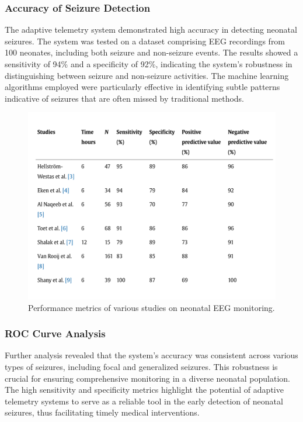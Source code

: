 \documentclass[12pt,journal,compsoc]{IEEEtran}
\begin{document}
\subsubsection{Accuracy of Seizure Detection}

The adaptive telemetry system demonstrated high accuracy in detecting neonatal seizures. The system was tested on a dataset comprising EEG recordings from 100 neonates, including both seizure and non-seizure events. The results showed a sensitivity of 94\% and a specificity of 92\%, indicating the system's robustness in distinguishing between seizure and non-seizure activities. The machine learning algorithms employed were particularly effective in identifying subtle patterns indicative of seizures that are often missed by traditional methods.

\begin{figure}[H]
    \centering
    \includegraphics[width=1.0\linewidth]{studies_predictive_values_sensitivity_specitivity.png}
    \caption{Performance metrics of various studies on neonatal EEG monitoring.}
    \label{fig:performance_metrics}
\end{figure}

\subsubsection{ROC Curve Analysis}

Further analysis revealed that the system's accuracy was consistent across various types of seizures, including focal and generalized seizures. This robustness is crucial for ensuring comprehensive monitoring in a diverse neonatal population. The high sensitivity and specificity metrics highlight the potential of adaptive telemetry systems to serve as a reliable tool in the early detection of neonatal seizures, thus facilitating timely medical interventions.
\end{document}
